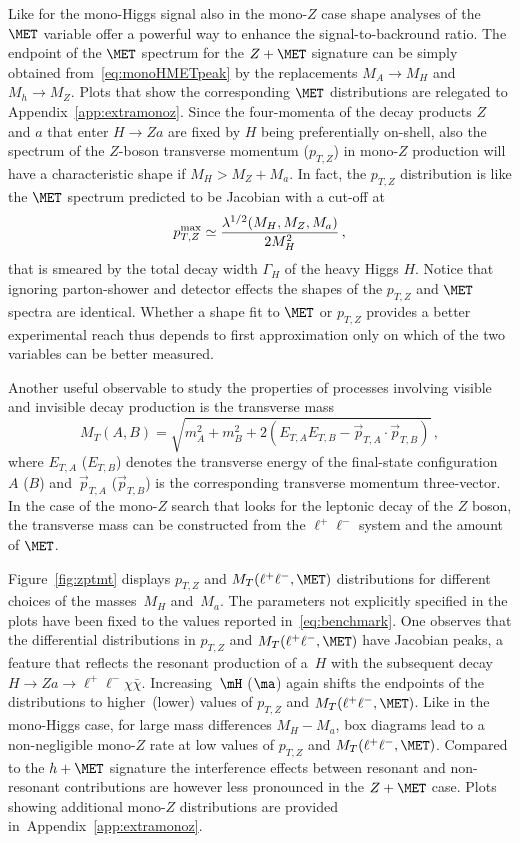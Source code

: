 Like for the mono-Higgs signal also in the mono-$Z$ case shape analyses of the~$\MET$ variable offer a powerful way to enhance the signal-to-backround ratio. The endpoint of the $\MET$ spectrum for the $Z+\MET$ signature can be simply obtained from~\eqref{eq:monoHMETpeak} by the replacements $M_A \to M_H$ and $M_h \to M_Z$. Plots that show the corresponding $\MET$ distributions are relegated to Appendix~\ref{app:extramonoz}. Since the four-momenta of the decay products $Z$ and $a$ that enter $H \to Za$ are fixed by $H$ being preferentially on-shell, also the spectrum of the $Z$-boson transverse momentum ($p_{T,Z}$) in mono-$Z$ production will have a characteristic shape if $M_H > M_Z + M_a$. In fact,  the $p_{T,Z}$ distribution is like the $\MET$ spectrum predicted  to be Jacobian with a cut-off at~\cite{No:2015xqa,Bauer:2017ota}
\begin{equation} \label{eq:monoZpTpeak}
p_{T,Z}^{ {\rm max} } \simeq \frac{\lambda^{1/2}(M_H, M_Z, M_a)}{2 M_H^2}\,,
\end{equation}
that is smeared by the total decay width $\Gamma_H$ of the heavy Higgs $H$. Notice that  ignoring parton-shower and detector effects the shapes of the $p_{T,Z}$ and $\MET$ spectra are identical. Whether a shape fit to $\MET$ or $p_{T,Z}$ provides a better experimental reach thus depends to first approximation only on which of the two variables can be better measured.

Another useful observable to study the properties of processes involving visible and invisible decay production is the transverse mass 
\begin{equation} \label{eq:transversemass}
M_T (A,B) = \sqrt{m_A^2+m_B^2 + 2 \left (E_{T,A} E_{T,B} - \vec{p}_{T,A} \cdot \vec{p}_{T,B} \right )} \,,
\end{equation}
where $E_{T,A}$ ($E_{T,B}$) denotes the transverse energy of the final-state configuration $A$ ($B$) and~$\vec{p}_{T,A}$  ($\vec{p}_{T,B}$) is the corresponding transverse momentum three-vector. In the case of the mono-$Z$ search that looks for the leptonic decay of the $Z$ boson, the transverse mass can be constructed from the $\ell^+ \ell^-$ system and the amount of $\MET$.  

Figure~\ref{fig:zptmt} displays  $p_{T,Z}$ and $M_T(\ell^+ \ell^-, \MET)$ distributions for different choices of the masses~$M_H$ and~$M_a$. The parameters not explicitly specified in the plots have been  fixed to the values reported in~\eqref{eq:benchmark}. One observes that the differential distributions in $p_{T,Z}$ and $M_T(\ell^+ \ell^-, \MET)$ have Jacobian peaks, a feature that  reflects the resonant production of a~$H$ with the subsequent decay $H \to Z a \to \ell^+ \ell^- \chi \bar \chi$.  Increasing~$\mH$ ($\ma$) again shifts the endpoints of the distributions to higher~(lower) values of $p_{T,Z}$ and $M_T(\ell^+ \ell^-, \MET)$. Like in the mono-Higgs case, for large mass differences $M_H - M_a$, box diagrams lead to a non-negligible mono-$Z$ rate at low values of $p_{T,Z}$ and $M_T(\ell^+ \ell^-, \MET)$. Compared to the $h + \MET$ signature the interference effects between resonant and non-resonant contributions  are however  less pronounced  in  the $Z + \MET$  case. Plots showing additional  mono-$Z$ distributions are provided in~Appendix~\ref{app:extramonoz}. 

